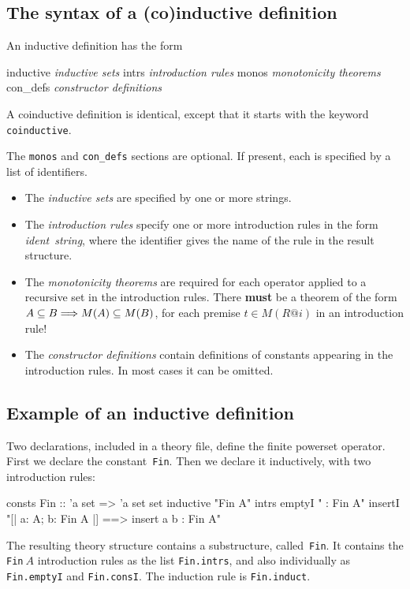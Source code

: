 \subsection{The syntax of a (co)inductive definition}
An inductive definition has the form
\begin{ttbox}
inductive    {\it inductive sets}
  intrs      {\it introduction rules}
  monos      {\it monotonicity theorems}
  con_defs   {\it constructor definitions}
\end{ttbox}
A coinductive definition is identical, except that it starts with the keyword
\texttt{coinductive}.  

The \texttt{monos} and \texttt{con_defs} sections are optional.  If present,
each is specified by a list of identifiers.

\begin{itemize}
\item The \textit{inductive sets} are specified by one or more strings.

\item The \textit{introduction rules} specify one or more introduction rules in
  the form \textit{ident\/}~\textit{string}, where the identifier gives the name of
  the rule in the result structure.

\item The \textit{monotonicity theorems} are required for each operator
  applied to a recursive set in the introduction rules.  There {\bf must}
  be a theorem of the form $A\subseteq B\Longrightarrow M(A)\subseteq M(B)$, for each
  premise $t\in M(R@i)$ in an introduction rule!

\item The \textit{constructor definitions} contain definitions of constants
  appearing in the introduction rules.  In most cases it can be omitted.
\end{itemize}


\subsection{Example of an inductive definition}
Two declarations, included in a theory file, define the finite powerset
operator.  First we declare the constant~\texttt{Fin}.  Then we declare it
inductively, with two introduction rules:
\begin{ttbox}
consts Fin :: 'a set => 'a set set
inductive "Fin A"
  intrs
    emptyI  "{\ttlbrace}{\ttrbrace} : Fin A"
    insertI "[| a: A;  b: Fin A |] ==> insert a b : Fin A"
\end{ttbox}
The resulting theory structure contains a substructure, called~\texttt{Fin}.
It contains the \texttt{Fin}$~A$ introduction rules as the list \texttt{Fin.intrs},
and also individually as \texttt{Fin.emptyI} and \texttt{Fin.consI}.  The induction
rule is \texttt{Fin.induct}.

